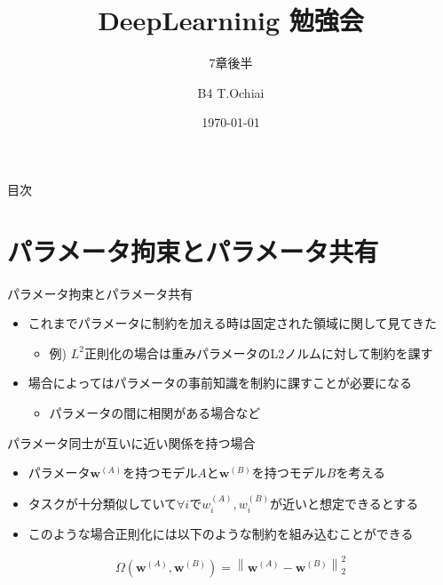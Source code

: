 \documentclass[dvipdfmx, 10pt]{beamer}
\title[]{DeepLearninig 勉強会}
\subtitle{7章後半}
\author[T.Ochiai]{B4 T.Ochiai}
\date[\today]{\today}
\institute[NIT]{Nagoya Institute of Technology \\ Takeuchi \& Karasuyama Lab}
\newcommand{\green}[1]{\textcolor{green!40!black}{#1}}
\begin{document}

\begin{frame}[plain]
\titlepage
\end{frame}


\begin{frame}{目次}
\tableofcontents[hideallsubsections]
\end{frame}


\section{パラメータ拘束とパラメータ共有}


\begin{frame}{パラメータ拘束とパラメータ共有}
  \begin{itemize}
    \item これまでパラメータに制約を加える時は固定された領域に関して見てきた
    \begin{itemize}
      \item 例) $L^{2}$正則化の場合は重みパラメータのL2ノルムに対して制約を課す
    \end{itemize}
    \item 場合によってはパラメータの事前知識を制約に課すことが必要になる
    \begin{itemize}
      \item パラメータの間に相関がある場合など
    \end{itemize}
  \end{itemize}
  \begin{exampleblock}{パラメータ同士が互いに近い関係を持つ場合}
    \begin{itemize}
      \item パラメータ$\bm{w}^{(A)}$を持つモデル$A$と$\bm{w}^{(B)}$を持つモデル$B$を考える
      \item タスクが十分類似していて$\forall{i}$で$w_{i}^{(A)} , w_{i}^{(B)}$が近いと想定できるとする
      \item このような場合正則化には以下のような制約を組み込むことができる
    \end{itemize}
    \begin{equation}
      \Omega\left(\boldsymbol{w}^{(A)}, \boldsymbol{w}^{(B)}\right)=\left\|\boldsymbol{w}^{(A)}-\boldsymbol{w}^{(B)}\right\|_{2}^{2} 
    \end{equation}
  \end{exampleblock}
  
\end{frame}
\end{document}
